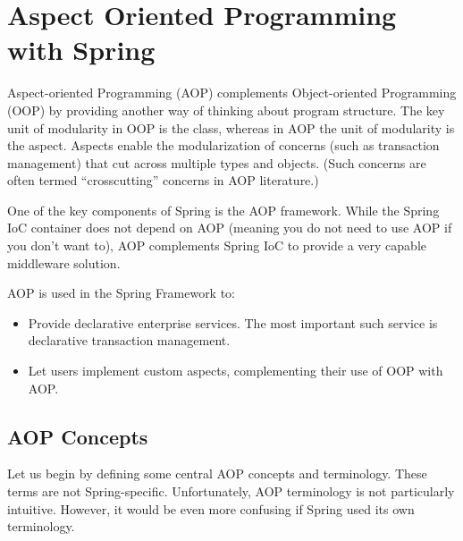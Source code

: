 \chapter{Aspect Oriented Programming with Spring}
Aspect-oriented Programming (AOP) complements Object-oriented Programming (OOP) by
providing another way of thinking about program structure. The key unit of modularity in OOP is
the class, whereas in AOP the unit of modularity is the aspect. Aspects enable the modularization of
concerns (such as transaction management) that cut across multiple types and objects. (Such
concerns are often termed “crosscutting” concerns in AOP literature.)

One of the key components of Spring is the AOP framework. While the Spring IoC container does
not depend on AOP (meaning you do not need to use AOP if you don’t want to), AOP complements
Spring IoC to provide a very capable middleware solution.

AOP is used in the Spring Framework to:

\begin{itemize}
    \item Provide declarative enterprise services. The most important such service is declarative
    transaction management.
    \item Let users implement custom aspects, complementing their use of OOP with AOP.
\end{itemize}

\section{AOP Concepts}
Let us begin by defining some central AOP concepts and terminology. These terms are not Spring-specific. Unfortunately, AOP terminology is not particularly intuitive. However, it would be even
more confusing if Spring used its own terminology.

